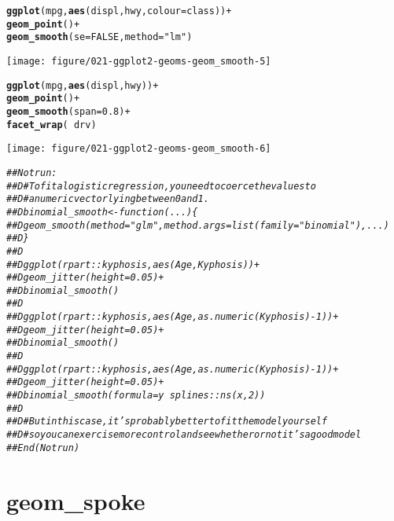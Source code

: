 \documentclass[a4paper,titlepage]{tufte-handout}\usepackage[]{graphicx}\usepackage[]{color}
\makeatletter
\def\maxwidth{ %
  \ifdim\Gin@nat@width>\linewidth
    \linewidth
  \else
    \Gin@nat@width
  \fi
}
\newcommand{\hlnum}[1]{\textcolor[rgb]{0.686,0.059,0.569}{#1}}%
\newcommand{\hlstr}[1]{\textcolor[rgb]{0.192,0.494,0.8}{#1}}%
\newcommand{\hlcom}[1]{\textcolor[rgb]{0.678,0.584,0.686}{\textit{#1}}}%
\newcommand{\hlopt}[1]{\textcolor[rgb]{0,0,0}{#1}}%
\newcommand{\hlstd}[1]{\textcolor[rgb]{0.345,0.345,0.345}{#1}}%
\newcommand{\hlkwc}[1]{\textcolor[rgb]{0.333,0.667,0.333}{#1}}%
\newcommand{\hlkwd}[1]{\textcolor[rgb]{0.737,0.353,0.396}{\textbf{#1}}}%
\newenvironment{kframe}{%
 \def\at@end@of@kframe{}%
 \ifinner\ifhmode%
  \def\at@end@of@kframe{\end{minipage}}%
  \begin{minipage}{\columnwidth}%
 \fi\fi%
 \def\FrameCommand##1{\hskip\@totalleftmargin \hskip-\fboxsep
 \colorbox{shadecolor}{##1}\hskip-\fboxsep
     \hskip-\linewidth \hskip-\@totalleftmargin \hskip\columnwidth}%
 \MakeFramed {\advance\hsize-\width
   \@totalleftmargin\z@ \linewidth\hsize
   \@setminipage}}%
 {\par\unskip\endMakeFramed%
 \at@end@of@kframe}
\newenvironment{knitrout}{}{} %
\makeatother
\begin{document}
\begin{knitrout}
\begin{kframe}
\begin{alltt}
\hlkwd{ggplot}\hlstd{(mpg,} \hlkwd{aes}\hlstd{(displ, hwy,} \hlkwc{colour} \hlstd{= class))} \hlopt{+}
  \hlkwd{geom_point}\hlstd{()} \hlopt{+}
  \hlkwd{geom_smooth}\hlstd{(}\hlkwc{se} \hlstd{=} \hlnum{FALSE}\hlstd{,} \hlkwc{method} \hlstd{=} \hlstr{"lm"}\hlstd{)}
\end{alltt}
\end{kframe}
\texttt{[image: figure/021-ggplot2-geoms-geom\_smooth-5]} 
\begin{kframe}\begin{alltt}
\hlkwd{ggplot}\hlstd{(mpg,} \hlkwd{aes}\hlstd{(displ, hwy))} \hlopt{+}
  \hlkwd{geom_point}\hlstd{()} \hlopt{+}
  \hlkwd{geom_smooth}\hlstd{(}\hlkwc{span} \hlstd{=} \hlnum{0.8}\hlstd{)} \hlopt{+}
  \hlkwd{facet_wrap}\hlstd{(}\hlopt{~}\hlstd{drv)}
\end{alltt}
\end{kframe}
\texttt{[image: figure/021-ggplot2-geoms-geom\_smooth-6]} 
\begin{kframe}\begin{alltt}
\hlcom{## Not run: }
\hlcom{##D # To fit a logistic regression, you need to coerce the values to}
\hlcom{##D # a numeric vector lying between 0 and 1.}
\hlcom{##D binomial_smooth <- function(...) \{}
\hlcom{##D   geom_smooth(method = "glm", method.args = list(family = "binomial"), ...)}
\hlcom{##D \}}
\hlcom{##D }
\hlcom{##D ggplot(rpart::kyphosis, aes(Age, Kyphosis)) +}
\hlcom{##D   geom_jitter(height = 0.05) +}
\hlcom{##D   binomial_smooth()}
\hlcom{##D }
\hlcom{##D ggplot(rpart::kyphosis, aes(Age, as.numeric(Kyphosis) - 1)) +}
\hlcom{##D   geom_jitter(height = 0.05) +}
\hlcom{##D   binomial_smooth()}
\hlcom{##D }
\hlcom{##D ggplot(rpart::kyphosis, aes(Age, as.numeric(Kyphosis) - 1)) +}
\hlcom{##D   geom_jitter(height = 0.05) +}
\hlcom{##D   binomial_smooth(formula = y ~ splines::ns(x, 2))}
\hlcom{##D }
\hlcom{##D # But in this case, it's probably better to fit the model yourself}
\hlcom{##D # so you can exercise more control and see whether or not it's a good model}
\hlcom{## End(Not run)}
\end{alltt}
\end{kframe}
\end{knitrout}


\section{geom\_spoke}
\end{document}
